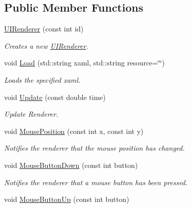 \subsection*{Public Member Functions}
\begin{DoxyCompactItemize}
\item 
\hypertarget{class_u_i_renderer_a8e0fb11ab4e123f3524756e276199351}{\hyperlink{class_u_i_renderer_a8e0fb11ab4e123f3524756e276199351}{U\-I\-Renderer} (const int id)}\label{class_u_i_renderer_a8e0fb11ab4e123f3524756e276199351}

\begin{DoxyCompactList}\small\item\em Creates a new \hyperlink{class_u_i_renderer}{U\-I\-Renderer}. \end{DoxyCompactList}\item 
void \hyperlink{class_u_i_renderer_a8e61394cd4b9dcf2242f1ec47e95ba5d}{Load} (std\-::string xaml, std\-::string resource=\char`\"{}\char`\"{})
\begin{DoxyCompactList}\small\item\em Loads the specified xaml. \end{DoxyCompactList}\item 
void \hyperlink{class_u_i_renderer_a9304bf4f0ff00a671cf45ac5a4198004}{Update} (const double time)
\begin{DoxyCompactList}\small\item\em Update Renderer. \end{DoxyCompactList}\item 
\hypertarget{class_u_i_renderer_a305ee68738d0b1b833b73a85ca077261}{void \hyperlink{class_u_i_renderer_a305ee68738d0b1b833b73a85ca077261}{Mouse\-Position} (const int x, const int y)}\label{class_u_i_renderer_a305ee68738d0b1b833b73a85ca077261}

\begin{DoxyCompactList}\small\item\em Notifies the renderer that the mouse position has changed. \end{DoxyCompactList}\item 
\hypertarget{class_u_i_renderer_aad758939d86e2741ed7330252cfe3b74}{void \hyperlink{class_u_i_renderer_aad758939d86e2741ed7330252cfe3b74}{Mouse\-Button\-Down} (const int button)}\label{class_u_i_renderer_aad758939d86e2741ed7330252cfe3b74}

\begin{DoxyCompactList}\small\item\em Notifies the renderer that a mouse button has been pressed. \end{DoxyCompactList}\item 
\hypertarget{class_u_i_renderer_a9d72b10f66816ecb07c51025130591bf}{void \hyperlink{class_u_i_renderer_a9d72b10f66816ecb07c51025130591bf}{Mouse\-Button\-Up} (const int button)}\label{class_u_i_renderer_a9d72b10f66816ecb07c51025130591bf}


\end{DoxyCompactItemize}
